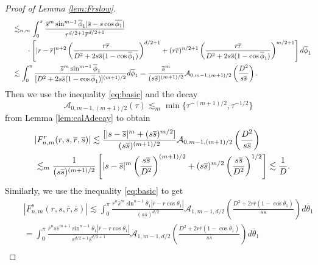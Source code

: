 \documentclass[10pt,a4paper]{amsart}
\newcommand{\br}[1]{\overline{#1}}
\newcommand{\calA}{\mathcal A}
\newcommand{\tht}{\theta}
\begin{document}
\begin{proof}[Proof of Lemma \ref{lem:Frslow}]
\begin{equation}
\begin{aligned}
				\quad&\lesssim _{n,m}%
				\int_{0}^{\pi}\frac{\br{s}^{m}\sin^{m-1}\br{\phi}_{1}|\br{s}-s\cos\br{\phi_{1}}|}{r^{d/2+1}\br{r}^{d/2+1}}\\
				&\qquad\cdot\left[|r-\br{r}|^{n+2}\left( \frac{r\br{r}}{D^{2}+2s\br{s}(1-\cos\br{\phi}_{1})}\right)^{d/2+1}+(r\br{r})^{n/2+1} \left( \frac{r\br{r}}{D^{2}+2s\br{s}(1-\cos\br{\phi}_{1})}\right)^{m/2+1}\right]d\br{\phi}_{1}\\
				\quad&\lesssim \int_{0}^{\pi}\frac{%
					\br{s}^{m}\sin^{m-1}\br{\phi}_{1}}{[D^{2}+2s\br{s}(1-\cos\br{\phi}_{1})]^{(m+1)/2}}d\br{\phi}_{1}=\frac{\br{s}^{m}}{(s\br{s})^{(m+1)/2}}\calA_{0,m-1,(m+1)/2}\left(\frac{D^{2}}{s\br{s}}\right).
			\end{aligned}
		\end{equation}
		Then we use the inequality \eqref{eq:basic} and the decay
		\begin{equation}
			\calA_{0,m-1,(m+1)/2}(\tau)\lesssim_{m} \min\{ \tau^{-(m+1)/2},\tau^{-1/2}\}
		\end{equation}
		from Lemma \ref{lem:calAdecay} to obtain
		\begin{equation}
			\begin{aligned}
				&|F_{n,m}^{r}(r,s,\br{r},\br{s})|\lesssim \frac{[|s-\br{s}|^{m}+(s\br{s})^{m/2}]}{(s\br{s})^{(m+1)/2}}\calA_{0,m-1,(m+1)/2}\left(\frac{D^{2}}{s\br{s}}\right)%
				\\
				\quad&\lesssim_{m} \frac{%
					1}{(s\br{s})^{(m+1)/2}}\left[|s-\br{s}|^{m}\left(\frac{s\br{s}}{D^{2}}\right)^{(m+1)/2}+(s\br{s})^{m/2}\left(\frac{s\br{s}}{D^{2}}\right)^{1/2}\right]\lesssim \frac{1%
				}{D}.
			\end{aligned}
		\end{equation}
		Similarly, we use the inequality \eqref{eq:basic} to get
		\begin{equation}
			\begin{aligned}
				&|F_{n,m}^{s}(r,s,\br{r},\br{s})|\lesssim \int_{0}^{\pi}\frac{\br{r}^{n}\br{s}^{m}\sin^{n-1}\br{\tht}_{1}|\br{r}-r\cos\br{\tht_{1}}|}{(s\br{s})^{d/2}}%
				\calA_{1,m-1,d/2}\left(\frac{D^{2}+2r\br{r}(1-\cos\br{\tht}_{1})}{s\br{s}}\right)d\br{\tht}_{1}\\
				\quad&=\int_{0}^{\pi}\frac{\br{r}^{n}s\br{s}^{m+1}\sin^{n-1}\br{\tht}_{1}|\br{r}-r\cos\br{\tht_{1}}|}{s^{d/2+1}\br{s}^{d/2+1}}\calA_{1,m-1,d/2}\left(\frac{D^{2}+2r\br{r}(1-\cos\br{\tht}_{1})}{s\br{s}}\right)d\br{\tht}_{1}\\

\end{aligned}
\end{equation}
\end{proof}
\end{document}
